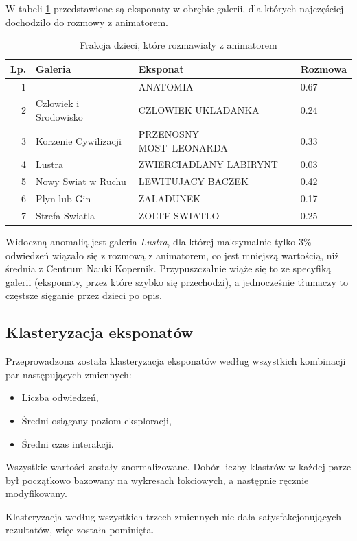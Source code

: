 \documentclass[conference]{IEEEtran}
\begin{document}
W tabeli \ref{top_animator_g} przedstawione są eksponaty w obrębie galerii, dla których najczęściej dochodziło do rozmowy z animatorem.
\begin{table}[H]
\caption{Frakcja dzieci, które rozmawiały z animatorem}
\label{top_animator_g}
\centering
\begin{tabular}{|r|l|p{3cm}|l|}
\hline
\textbf{Lp.} & \textbf{Galeria} & \textbf{Eksponat} & \textbf{Rozmowa} \\
\hline
1 &                --- &                ANATOMIA &  0.67	\\
2 & Czlowiek i Srodowisko &      CZLOWIEK UKLADANKA &  0.24	\\
3 &  Korzenie Cywilizacji & PRZENOSNY MOST~LEONARDA &  0.33	\\
4 &                Lustra &  ZWIERCIADLANY LABIRYNT & 0.03	\\
5 &    Nowy Swiat w Ruchu &       LEWITUJACY BACZEK &  0.42	\\
6 &          Plyn lub Gin &               ZALADUNEK &  0.17	\\
7 &        Strefa Swiatla &           ZOLTE SWIATLO &  0.25 \\
\hline
\end{tabular}
\end{table}
Widoczną anomalią jest galeria \textit{Lustra}, dla której maksymalnie tylko 3\% odwiedzeń wiązało się z rozmową z animatorem, co jest mniejszą wartością, niż średnia z Centrum Nauki Kopernik. Przypuszczalnie wiąże się to ze specyfiką galerii (eksponaty, przez które szybko się przechodzi), a jednocześnie tłumaczy to częstsze sięganie przez dzieci po opis.

\subsection{Klasteryzacja eksponatów}
Przeprowadzona została klasteryzacja eksponatów według wszystkich kombinacji par następujących zmiennych:
\begin{itemize}
\item Liczba odwiedzeń,
\item Średni osiągany poziom eksploracji,
\item Średni czas interakcji.
\end{itemize}
Wszystkie wartości zostały znormalizowane. Dobór liczby klastrów w każdej parze był początkowo bazowany na wykresach łokciowych, a następnie ręcznie modyfikowany.

Klasteryzacja według wszystkich trzech zmiennych nie dała satysfakcjonujących rezultatów, więc została pominięta.
\end{document}
